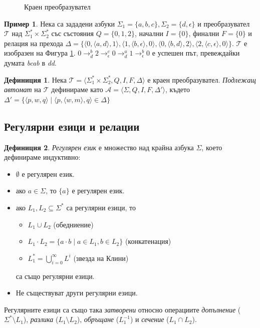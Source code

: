 \documentclass[12pt, oneside]{article}
\theoremstyle{definition}
\newtheorem{definition}{Дефиниция}[section]
\newtheorem{example}{Пример}[section]
\begin{document}
\begin{figure}[!htb]
	\centering
	
	\caption{Краен преобразувател}
	\label{fig:Fst}
\end{figure}

\begin{example}
	Нека са зададени азбуки \( \Sigma_1 = \{ a,b,c \}, \Sigma_2 = \{ d,\epsilon \} \) и преобразувател \( \mathcal{T} \) над \( \Sigma_1^* \times \Sigma_2^*\) със състояния \( Q = \{ 0, 1, 2 \} \), начални \( I = \{ 0 \} \), финални \( F = \{ 0 \} \) и релация на прехода \( \Delta = \{ \langle 0, \langle a, d \rangle, 1 \rangle, \langle 1, \langle b, \epsilon \rangle, 0 \rangle, \langle 0, \langle b, d \rangle, 2 \rangle, \langle 2, \langle c, \epsilon \rangle, 0 \rangle \} \). \newline
	\( \mathcal{T} \) е изобразен на Фигура \ref{fig:Fst}. \newline
	\( 0 \to^{b}_{d} 2 \to^{c}_{\epsilon} 0 \to^{a}_{d} 1 \to^{b}_{\epsilon} 0 \) е успешен път, превеждайки думата \emph{bcab} в \emph{dd}.
\end{example}

\begin{definition}
	Нека \( \mathcal{T} = \langle \Sigma_1^* \times \Sigma_2^*, Q, I, F, \Delta \rangle \) е краен преобразувател. \emph{Подлежащ автомат} на \( \mathcal{T} \) дефинираме като \( \mathcal{A} = \langle \Sigma, Q, I, F, \Delta' \rangle \), където \( \Delta' = \{ \langle p, w, q \rangle \mid \langle p, \langle w, m \rangle, q \rangle \in \Delta \}\)
\end{definition}

\subsection{Регулярни езици и релации}

\begin{definition} 
	\emph{Регулярен език} е множество над крайна азбука \( \Sigma \), което дефинираме индуктивно:
	\begin{itemize}
		\item \( \emptyset \) е регулярен език.
		\item ако \( a \in \Sigma \), то \( \{ a \} \) е регулярен език.
		\item ако \( L_1, L_2 \subseteq \Sigma^* \) са регулярни езици, то 
		\begin{itemize}
			\item \( L_1 \cup L_2 \) (обедниение)
			\item \( L_1 \cdot L_2 = \{ a \cdot b \mid a \in L_1, b \in L_2 \} \) (конкатенация)
			\item \( L_1^* = \bigcup_{i=0}^{\infty}L^i \) (звезда на Клини)
		\end{itemize}
		 са също регулярни езици.
		\item Не съществуват други регулярни езици.
	\end{itemize}
	Регулярните езици са също така \emph{затворени} относно операциите \emph{допълнение} (\( \Sigma^* \setminus L_1 \)), \emph{разлика} (\( L_1 \setminus L_2 \)), \emph{обръщане} (\( L_1^{-1} \)) и \emph{сечение} (\( L_1 \cap L_2 \)).
\end{definition}
\end{document}
